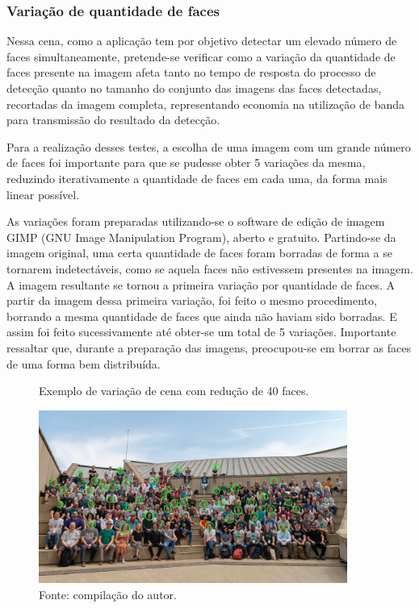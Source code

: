 

\subsubsection{Variação de quantidade de faces}

Nessa cena, como a aplicação tem por objetivo detectar um elevado número de faces simultaneamente, pretende-se verificar como a variação da quantidade de faces presente na imagem afeta tanto no tempo de resposta do processo de detecção quanto no tamanho do conjunto das imagens das faces detectadas, recortadas da imagem completa, representando economia na utilização de banda para transmissão do resultado da detecção.

Para a realização desses testes, a escolha de uma imagem com um grande número de faces foi importante para que se pudesse obter 5 variações da mesma, reduzindo iterativamente a quantidade de faces em cada uma, da forma mais linear possível.

As variações foram preparadas utilizando-se o software de edição de imagem GIMP (GNU Image Manipulation Program), aberto e gratuito. Partindo-se da imagem original, uma certa quantidade de faces foram borradas de forma a se tornarem indetectáveis, como se aquela faces não estivessem presentes na imagem. A imagem resultante se tornou a primeira variação por quantidade de faces. A partir da imagem dessa primeira variação, foi feito o mesmo procedimento, borrando a mesma quantidade de faces que ainda não haviam sido borradas. E assim foi feito sucessivamente até obter-se um total de 5 variações. Importante ressaltar que, durante a preparação das imagens, preocupou-se em borrar as faces de uma forma bem distribuída.

\begin{figure}[h]
    \centering
    \caption[Exemplo de variação de cena com redução de 40 faces.]{Exemplo de variação de cena com redução de 40 faces.}
    \includegraphics[width=0.9\textwidth]{Cap3_Desenvolvimento/Figures/exemplo_variacao_faces.jpg}
    \caption*{Fonte: compilação do autor.\footnotemark[\value{footnote}]}
    \label{fig:exemploVariacaoFaces}
\end{figure}

